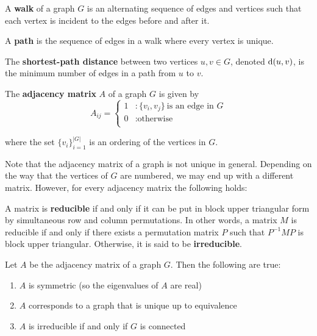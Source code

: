 \begin{definition}
  \label{def:walk_path}

  A \textbf{walk} of a graph $G$ is an alternating sequence of edges and vertices such that each
  vertex is incident to the edges before and after it.

  A \textbf{path} is the sequence of edges in a walk where every vertex is unique.

  The \textbf{shortest-path distance} between two vertices $u,v \in G$, denoted $\mathrm{d}(u,v)$, is the
  minimum number of edges in a path from $u$ to $v$.
\end{definition}

\begin{definition}
  \label{def:adj_mat}
  The \textbf{adjacency matrix} $A$ of a graph $G$ is given by
  \[
    A_{ij} = \begin{cases}
      1 &: \{v_i,v_j\} ~\text{is an edge in $G$} \\
      0 &: \text{otherwise} \\
    \end{cases}
  \]

  where the set $\{v_i\}_{i=1}^{|G|}$ is an ordering of the vertices in $G$.
\end{definition}
 

Note that the adjacency matrix of a graph is not unique in general. Depending on
the way that the vertices of $G$ are numbered, we may end up with a different
matrix. However, for every adjacency matrix the following holds:


\begin{definition}
  A matrix is \textbf{reducible} if and only if it can be put in block upper triangular
  form by simultaneous row and column permutations. In other words, a matrix $M$
  is reducible if and only if there exists a permutation matrix $P$ such that
  $P^{-1}MP$ is block upper triangular. Otherwise, it is said to be
  \textbf{irreducible}.
\end{definition}

\begin{proposition}
  \label{prop:adj}
  Let $A$ be the adjacency matrix of a graph $G$. Then the following are true:

  \begin{enumerate}
  \item $A$ is symmetric (so the eigenvalues of $A$ are real)
  \item $A$ corresponds to a graph that is unique up to equivalence
  \item $A$ is irreducible if and only if $G$ is connected
  \end{enumerate}
\end{proposition}

